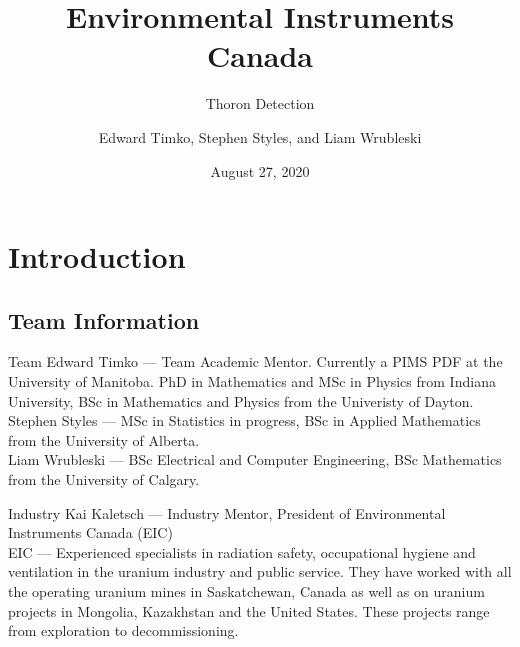 \documentclass{beamer}
\title[Thoron Detection] %
{Environmental Instruments Canada}
\subtitle
{ Thoron Detection}
\author[S. Styles, E. Timko, L. Wrubleski]{Edward Timko, Stephen Styles, and Liam Wrubleski} %
\institute[PIMS]{Pacific Institute of Mathematical Sciences} %
\date{August 27, 2020}
\newcommand{\nologo}{\setbeamertemplate{logo}{}}
\begin{document}
{\nologo
\begin{frame}
\maketitle
\begin{center}
\end{center}

\end{frame}
}
\section{Introduction}
\subsection{Team Information}
\begin{frame}{Team}
    Edward Timko --- Team Academic Mentor. Currently a PIMS PDF at the University of Manitoba. PhD in Mathematics and MSc in Physics from Indiana University, BSc in Mathematics and Physics from the Univeristy of Dayton.  \\
    \vspace{0.2cm}
    Stephen Styles --- MSc in Statistics in progress, BSc in Applied Mathematics from the University of Alberta. \\
    \vspace{0.2cm}
    Liam Wrubleski --- BSc Electrical and Computer Engineering, BSc Mathematics from the University of Calgary. \\
\end{frame}

\begin{frame}{Industry}
    Kai Kaletsch --- Industry Mentor, President of Environmental Instruments Canada (EIC)\\
    \vspace{0.2cm}
    EIC --- Experienced specialists in radiation safety, occupational hygiene and ventilation in the uranium industry and public service. They have worked with all the operating uranium mines in Saskatchewan, Canada as well as on uranium projects in Mongolia, Kazakhstan and the United States. These projects range from exploration to decommissioning.\\
\end{frame}
\end{document}
